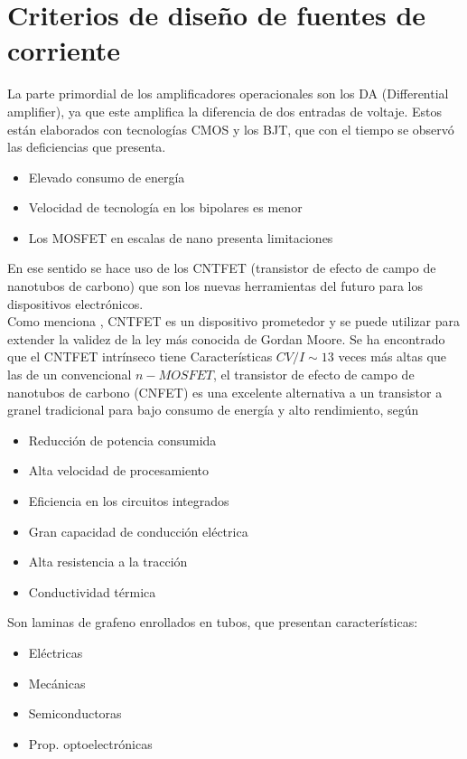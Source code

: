 \documentclass[conference]{IEEEtran} %
\begin{document}
\section{Criterios de diseño de fuentes de corriente}
La parte primordial de los amplificadores operacionales son los DA (Differential amplifier), ya que este amplifica la diferencia de dos entradas de voltaje. Estos están elaborados con tecnologías CMOS y los BJT, que con el tiempo se observó las deficiencias que presenta.
\begin{itemize}
	\item Elevado consumo de energía
	\item Velocidad de tecnología en los bipolares es menor
	\item Los MOSFET en escalas de nano presenta limitaciones
\end{itemize}

En ese sentido se hace uso de los CNTFET (transistor de efecto de campo de nanotubos de carbono) que son los nuevas herramientas del futuro para los dispositivos electrónicos.\\
Como menciona \cite{Akhoon}, CNTFET es un dispositivo prometedor y se puede utilizar para extender la validez de la ley más conocida de Gordan Moore. Se ha encontrado que el CNTFET intrínseco tiene Características $CV/I \sim 13$ veces más altas que las de un convencional $n-MOSFET$, el transistor de efecto de campo de nanotubos de carbono (CNFET) es una excelente alternativa a un transistor a granel tradicional para bajo consumo de energía y alto rendimiento, según \cite{Liu}

\begin{itemize}
	\item Reducción de potencia consumida 
	\item Alta velocidad de procesamiento
	\item Eficiencia en los circuitos integrados 
	\item Gran capacidad de conducción eléctrica 
	\item Alta resistencia a la tracción
	\item Conductividad térmica
\end{itemize}

Son laminas de grafeno enrollados en tubos, que presentan características: 

\begin{itemize}
	\item Eléctricas
	\item Mecánicas
	\item Semiconductoras
	\item Prop. optoelectrónicas
\end{itemize}
\end{document}
